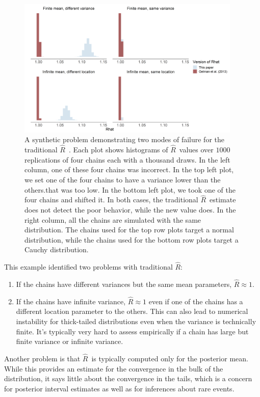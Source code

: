 \documentclass[american,]{article}
\newcommand{\Rhat}{$\widehat{R}$}
\theoremstyle{definition}
\begin{document}
\begin{figure}
\centering
\includegraphics[width=0.95\textwidth]{graphics/simple_rhat_compare.png}
\caption{A synthetic problem demonstrating
two modes of failure for the traditional \Rhat\ . Each plot shows
histograms of \Rhat\ values over $1000$ replications of four chains each
with a thousand draws. In the left column, one of these four chains was 
incorrect. In the top left plot, we set one of the four chains to have a variance lower than the others.that was too low.
In the bottom left plot, we took one of the four chains and shifted it.
In both cases, the traditional \Rhat\ estimate does not detect the poor
behavior, while the new value does. In the right column, all the chains are
simulated with the same distribution. The chains used for the top row plots target 
a normal distribution, while the chains used for the bottom row plots target
a Cauchy distribution. \label{fig:simple_example}}
\end{figure}

This example identified two problems with traditional \Rhat : 
\begin{enumerate}
\item If the chains have different variances but the same mean parameters, $\widehat{R} \approx 1$.
\item If the chains have infinite variance, $\widehat{R} \approx 1$ even if one of the chains has a different location parameter to the others. This can also lead to numerical instability for thick-tailed distributions even when the variance is technically finite. It's typically very hard to assess empirically
if a chain has large but finite variance or infinite variance.
\end{enumerate}

Another problem is that \Rhat\ is
typically computed only for the posterior mean. While this provides an estimate 
for the convergence in the bulk of the distribution, it says little about the 
convergence in the tails, which is a concern for posterior 
interval estimates as well as for inferences about rare events.
 
\end{document}

